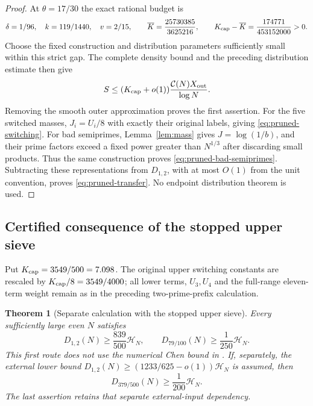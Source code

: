 \documentclass[11pt]{article}
\newtheorem{theorem}{Theorem}
\newcommand{\CN}{\mathcal C(N)}
\newcommand{\HN}{\mathcal H_N}
\begin{document}
\begin{proof}
At $\theta=17/30$ the exact rational budget is
\[
 \delta=1/96,\quad k=119/1440,\quad v=2/15,\qquad
 \overline K=\frac{25730385}{3625216},\qquad
 K_{\rm cap}-\overline K=\frac{174771}{453152000}>0.
\]
Choose the fixed construction and distribution parameters sufficiently
small within this strict gap. The complete density bound and the
preceding distribution estimate then give
\[
 S\le(K_{\rm cap}+o(1))\frac{\CN X_{\rm out}}{\log N}.
\]
Removing the smooth outer approximation proves the first assertion.
For the five switched masses, $J_i=U_i/8$ with exactly their original
labels, giving \eqref{eq:pruned-switching}. For bad semiprimes,
Lemma~\ref{lem:mass} gives $J=\log(1/b)$, and their prime factors
exceed a fixed power greater than $N^{1/3}$ after discarding small
products. Thus the same construction proves
\eqref{eq:pruned-bad-semiprimes}. Subtracting these representations
from $D_{1,2}$, with at most $O(1)$ from the unit convention, proves
\eqref{eq:pruned-transfer}. No endpoint distribution theorem is used.
\end{proof}

\subsection{Certified consequence of the stopped upper sieve}
\label{sec:pruned-upper-corollary}
Put $K_{\rm cap}=3549/500=7.098$. The original upper switching
constants are rescaled by $K_{\rm cap}/8=3549/4000$; all lower
terms, $U_3,U_4$ and the full-range eleven-term weight remain as
in the preceding two-prime-prefix calculation.

\begin{theorem}[Separate calculation with the stopped upper sieve]
\label{thm:pruned-chen}
Every sufficiently large even $N$ satisfies
\[
 D_{1,2}(N)\ge\frac{839}{500}\HN,
 \qquad D_{79/100}(N)\ge\frac1{250}\HN.
\]
This first route does not use the numerical Chen bound in \cite{Li2026}.
If, separately, the external lower bound
$D_{1,2}(N)\ge(1233/625-o(1))\HN$ is assumed, then
\[
 D_{379/500}(N)\ge\frac1{200}\HN.
\]
The last assertion retains that separate external-input dependency.
\end{theorem}
\end{document}

